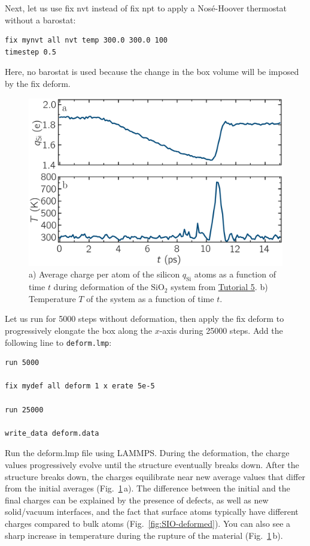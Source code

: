 \documentclass[9pt,tutorial]{livecoms}
\newcommand{\lmpcmd}[1]{\hspace{0pt}\colorbox{listing}{\textcolor{command}{\small{#1}}}\hspace{0pt}} %
\newcommand{\flecmd}[1]{\textcolor{command}{\texttt{#1}}} %
\begin{document}
Next, let us use \lmpcmd{fix nvt} instead of \lmpcmd{fix npt} to apply a
Nosé-Hoover thermostat without a barostat:
\begin{lstlisting}
fix mynvt all nvt temp 300.0 300.0 100
timestep 0.5
\end{lstlisting}
Here, no barostat is used because the change in the box volume will be imposed
by the \lmpcmd{fix deform}.

\begin{figure}
\includegraphics[width=\linewidth]{SIO-deformed-charge}
\caption{a) Average charge per atom of the silicon $q_\text{Si}$ atoms as
a function of time $t$ during deformation of the $\text{SiO}_2$ system
from \hyperref[reactive-silicon-dioxide-label]{Tutorial 5}.  b) Temperature $T$ of the
system as a function of time $t$.}
\label{fig:SIO-deformed-charge}
\end{figure}

Let us run for 5000 steps without deformation, then apply the \lmpcmd{fix deform}
to progressively elongate the box along the $x$-axis during 25000 steps.  Add
the following line to \flecmd{deform.lmp}:
\begin{lstlisting}
run 5000

fix mydef all deform 1 x erate 5e-5

run 25000

write_data deform.data
\end{lstlisting}
Run the \lmpcmd{deform.lmp} file using LAMMPS.  During the deformation, the charge
values progressively evolve until the structure eventually breaks down.  After the
structure breaks down, the charges equilibrate near new average values that differ
from the initial averages (Fig.~\ref{fig:SIO-deformed-charge}\,a).  The difference
between the initial and the final charges can be explained by the presence of
defects, as well as new solid/vacuum interfaces, and the fact that surface atoms
typically have different charges compared to bulk atoms (Fig.~\ref{fig:SIO-deformed}).
You can also see a sharp increase in temperature during the rupture of
the material (Fig.~\ref{fig:SIO-deformed-charge}\,b).
\end{document}
